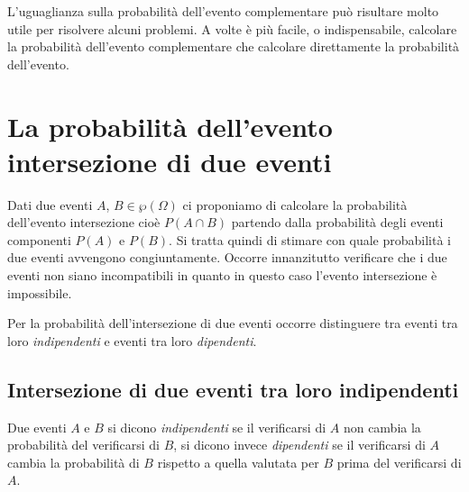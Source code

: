 \osservazione L'uguaglianza sulla probabilità dell'evento complementare può risultare molto utile per risolvere alcuni problemi. A volte è più facile, o indispensabile, calcolare la probabilità dell'evento complementare che calcolare direttamente la probabilità dell'evento.

\vspazio\ovalbox{\risolvii \ref{ese:9.38}, \ref{ese:9.39}, \ref{ese:9.40}, \ref{ese:9.41}, \ref{ese:9.42}, \ref{ese:9.43}, \ref{ese:9.44}, \ref{ese:9.45}}

\section{La probabilità dell'evento intersezione di due eventi}

Dati due eventi $A$, $B\in \wp(\Omega)$ ci proponiamo di calcolare la probabilità dell'evento intersezione cioè $P(A\cap B)$ partendo dalla probabilità degli eventi componenti $P(A)$ e $P(B)$. Si tratta quindi di stimare con quale probabilità i due eventi avvengono congiuntamente. Occorre innanzitutto verificare che i due eventi non siano incompatibili in quanto in questo caso l'evento intersezione è impossibile.

Per la probabilità dell'intersezione di due eventi occorre distinguere tra eventi tra loro \emph{indipendenti} e eventi tra loro \emph{dipendenti}.

\subsection{Intersezione di due eventi tra loro indipendenti}

\begin{definizione}
Due eventi $A$ e $B$ si dicono \emph{indipendenti} se il verificarsi di $A$ non cambia la probabilità del verificarsi di $B$, si dicono invece \emph{dipendenti} se il verificarsi di $A$ cambia la probabilità di $B$ rispetto a quella valutata per $B$ prima del verificarsi di $A$.
\end{definizione}

